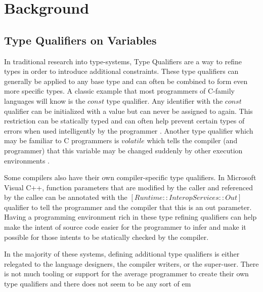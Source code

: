 \chapter{Background}

\section{Type Qualifiers on Variables}

In traditional research into type-systems, Type Qualifiers are a way to refine types in order to introduce additional constraints.  These type qualifiers can generally be applied to any base type and can often be combined to form even more specific types.  A classic example that most programmers of C-family languages will know is the $const$ type qualifier.  Any identifier with the $const$ qualifier can be initialized with a value but can never be assigned to again.  This restriction can be statically typed and can often help prevent certain types of errors when used intelligently by the programmer \cite{theory-of-qual}.  Another type qualifier which may be familiar to C programmers is $volatile$ which tells the compiler (and programmer) that this variable may be changed suddenly by other execution environments \cite{theory-of-qual}.

Some compilers also have their own compiler-specific type qualifiers.  In Microsoft Visual C++, function parameters that are modified by the caller and referenced by the callee can be annotated with the $[Runtime::InteropServices::Out]$ qualifier to tell the programmer and the compiler that this is an out parameter.  Having a programming environment rich in these type refining qualifiers can help make the intent of source code easier for the programmer to infer and make it possible for those intents to be statically checked by the compiler.  

In the majority of these systems, defining additional type qualifiers is either relegated to the language designers, the compiler writers, or the super-user.  There is not much tooling or support for the average programmer to create their own type qualifiers and there does not seem to be any sort of em
